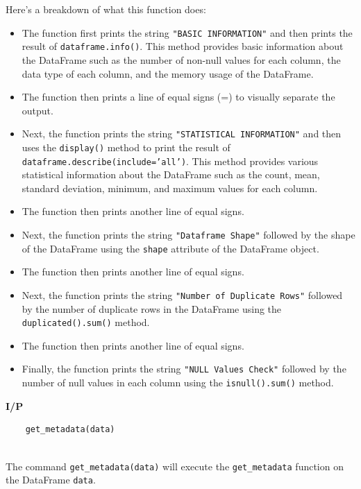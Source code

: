 Here's a breakdown of what this function does:
\begin{itemize}
    \item The function first prints the string \texttt{"BASIC INFORMATION"} and then prints the result 
    of \texttt{dataframe.info()}. This method provides basic information about the DataFrame 
    such as the number of non-null values for each column, the data type of each column, 
    and the memory usage of the DataFrame.
    \item The function then prints a line of equal signs (=) to visually separate the output.
    \item Next, the function prints the string \texttt{"STATISTICAL INFORMATION"} and then uses 
    the \texttt{display()} method to print the result of\\ \texttt{dataframe.describe(include='all')}. This 
    method provides various statistical information about the DataFrame such as the 
    count, mean, standard deviation, minimum, and maximum values for each column.
    \item The function then prints another line of equal signs.
    \item Next, the function prints the string \texttt{"Dataframe Shape"} followed by the shape of the 
    DataFrame using the \texttt{shape} attribute of the DataFrame object.
    \item The function then prints another line of equal signs.
    \item Next, the function prints the string \texttt{"Number of Duplicate Rows"} followed by the 
    number of duplicate rows in the DataFrame using the \texttt{duplicated().sum()} method.
    \item The function then prints another line of equal signs.
    \item Finally, the function prints the string \texttt{"NULL Values Check"} followed by the number of 
    null values in each column using the \texttt{isnull().sum()} method.
\end{itemize}
\noindent
\textbf{I/P} \\[-1.5em] %

\begin{verbatim}
    get_metadata(data)
\end{verbatim}
\\
\noindent
The command \texttt{get\_metadata(data)} will execute the \texttt{get\_metadata} function on the 
DataFrame \texttt{data}. 

